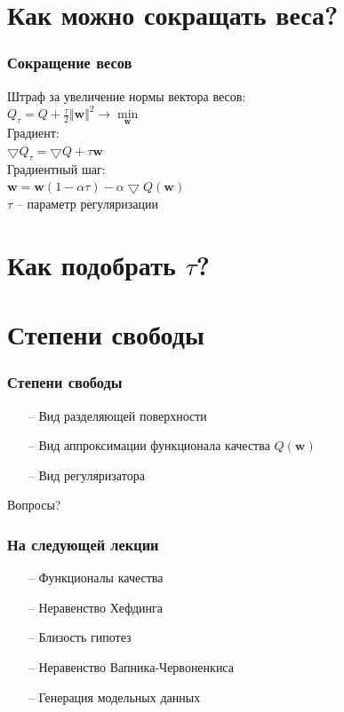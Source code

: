 \documentclass[10pt]{beamer}
\begin{document}
\section{Как можно сокращать веса?}

\begin{frame}\frametitle{Сокращение весов}
	Штраф за увеличение нормы вектора весов:\\
	$Q_{\tau} = Q + \frac{\tau}{2}\Vert \mathbf{w} \Vert^2 \rightarrow \min\limits_{\mathbf{w}}$\\
	\bigbreak
	Градиент:\\
	$\bigtriangledown Q_{\tau} = \bigtriangledown Q + \tau \mathbf{w}$\\
	\bigbreak
	Градиентный шаг:\\
	$\mathbf{w} = \mathbf{w}(1-\alpha \tau) - \alpha \bigtriangledown Q(\mathbf{w})$\\
	$\tau$ -- параметр регуляризации
\end{frame}

\section{Как подобрать $\tau$?}

\section{Степени свободы}

\begin{frame}\frametitle{Степени свободы}
	\begin{itemize}
		\item[--] Вид разделяющей поверхности
		\item[--] Вид аппроксимации функционала качества $Q(\mathbf{w})$
		\item[--] Вид регуляризатора
	\end{itemize}
\end{frame}

\begin{frame}[standout]
  Вопросы?
\end{frame}

\appendix

\begin{frame}\frametitle{На следующей лекции}
	\begin{itemize}
    	\item[--] Функционалы качества
    	\item[--] Неравенство Хефдинга
    	\item[--] Близость гипотез
    	\item[--] Неравенство Вапника-Червоненкиса
    	\item[--] Генерация модельных данных    	    	
	\end{itemize}
\end{frame}
\end{document}
